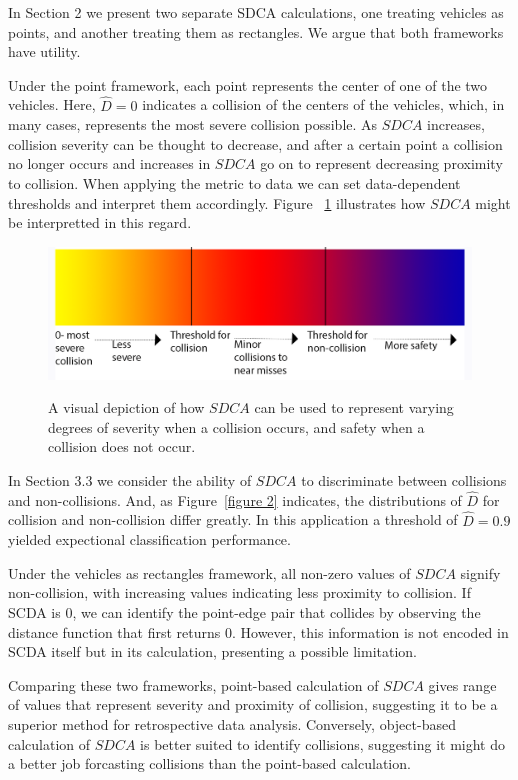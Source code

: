 \documentclass{article}
\begin{document}
In Section 2 we present two separate SDCA calculations, one treating vehicles as points, and another treating them as rectangles. We argue that both frameworks have utility.

Under the point framework, each point represents the center of one of the two vehicles. Here, $\hat{D} = 0$ indicates a collision of the centers of the vehicles, which, in many cases, represents the most severe collision possible. As $SDCA$ increases, collision severity can be thought to decrease, and after a certain point a collision no longer occurs and increases in $SDCA$ go on to represent decreasing proximity to collision.  When applying the metric to data we can set data-dependent thresholds and interpret them accordingly.  Figure~ \ref{figure 4} illustrates how $SDCA$ might be interpretted in this regard.

\begin{figure}[h!]
\begin{center}
\includegraphics[width = 12cm, height = 3 cm]{discussion_1.png}
\label{figure 4}
\caption{A visual depiction of how $SDCA$ can be used to represent varying degrees of severity when a collision occurs, and safety when a collision does not occur. }
\end{center}
\end{figure}

In Section 3.3 we consider the ability of $SDCA$ to discriminate between collisions and non-collisions. And, as Figure~\ref{figure 2} indicates, the distributions of $\hat{D}$ for collision and non-collision differ greatly.  In this application a threshold of $\hat{D} = 0.9$ yielded expectional classification performance.

Under the vehicles as rectangles framework, all non-zero values of $SDCA$ signify non-collision, with increasing values indicating less proximity to collision. If SCDA is 0, we can identify the point-edge pair that collides by observing the distance function that first returns 0. However, this information is not encoded in SCDA itself but in its calculation, presenting a possible limitation.

Comparing these two frameworks, point-based calculation of $SDCA$ gives range of values that represent severity and proximity of collision, suggesting it to be a superior method for retrospective data analysis.  Conversely, object-based calculation of $SDCA$ is better suited to identify collisions, suggesting it might do a better job forcasting collisions than the point-based calculation.
\end{document}
